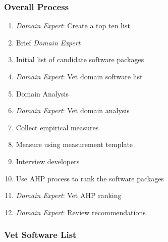 \documentclass[t,12pt,numbers,fleqn]{beamer}
\begin{document}

\begin{frame}
\frametitle{Overall Process}

\begin{enumerate}
\item \emph{Domain Expert}: Create a top ten list
\item Brief \emph{Domain Expert}
\item Initial list of candidate software packages
\item \emph{Domain Expert}: Vet domain software list
\item Domain Analysis
\item \emph{Domain Expert}: Vet domain analysis
\item Collect empirical measures
\item Measure using measurement template
\item Interview developers
\item Use AHP process to rank the software packages
\item \emph{Domain Expert}: Vet AHP ranking
\item \emph{Domain Expert}: Review recommendations
\end{enumerate}

\end{frame}


\begin{frame}
\frametitle{Vet Software List}

\bi
\item {}
\item {}
\item {}
\item {}
\ei
  
\end{frame}

\end{document}
